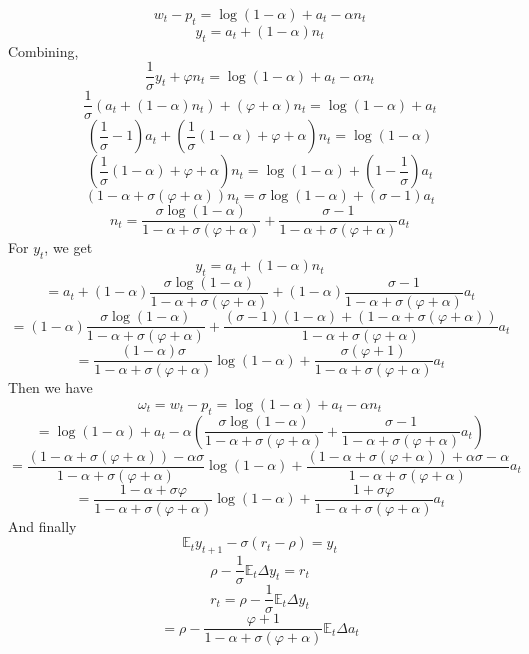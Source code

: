 \documentclass[10pt,letter]{article}
\begin{document}
\[ w_t - p_t = \log (1-\alpha) + a_t - \alpha n_t \]
\[ y_t = a_t + (1-\alpha) n_t \]
Combining,
\[ \frac{1}{\sigma}y_t + \varphi n_t = \log (1-\alpha) + a_t - \alpha n_t\]
\[ \frac{1}{\sigma}(a_t + (1-\alpha) n_t) + (\varphi + \alpha) n_t = \log (1-\alpha) + a_t \]
\[ \left(\frac{1}{\sigma} - 1\right) a_t + \left(\frac{1}{\sigma}(1-\alpha) + \varphi + \alpha \right) n_t  = \log (1-\alpha) \]
\[ \left(\frac{1}{\sigma}(1-\alpha) + \varphi + \alpha \right) n_t  = \log (1-\alpha) + \left(1 - \frac{1}{\sigma} \right) a_t  \]
\[ \left( 1-\alpha + \sigma(\varphi + \alpha) \right) n_t  = \sigma \log (1-\alpha) + \left(\sigma - 1 \right) a_t  \]
\[  n_t  = \frac{\sigma \log (1-\alpha)}{1-\alpha + \sigma(\varphi + \alpha) } + \frac{\sigma - 1}{ 1-\alpha + \sigma(\varphi + \alpha)}  a_t  \]
For $y_t$, we get
\[ y_t = a_t + (1-\alpha) n_t \]
\[ = a_t + (1-\alpha)\frac{\sigma \log (1-\alpha)}{1-\alpha + \sigma(\varphi + \alpha) } + (1-\alpha)\frac{\sigma - 1}{ 1-\alpha + \sigma(\varphi + \alpha)}  a_t \]
\[ = (1-\alpha)\frac{\sigma \log (1-\alpha)}{1-\alpha + \sigma(\varphi + \alpha) } + \frac{(\sigma - 1)(1-\alpha) + (1-\alpha + \sigma(\varphi + \alpha))}{ 1-\alpha + \sigma(\varphi + \alpha)}  a_t \]
\[ = \frac{(1-\alpha)\sigma }{1-\alpha + \sigma(\varphi + \alpha) }\log (1-\alpha) + \frac{\sigma(\varphi + 1)}{ 1-\alpha + \sigma(\varphi + \alpha)}  a_t \]
Then we have
\[ \omega_t = w_t - p_t = \log (1-\alpha) + a_t - \alpha n_t \]
\[ = \log (1-\alpha) + a_t - \alpha \left(\frac{\sigma \log (1-\alpha)}{1-\alpha + \sigma(\varphi + \alpha) } + \frac{\sigma - 1}{ 1-\alpha + \sigma(\varphi + \alpha)}  a_t  \right)\]
\[ =  \frac{(1-\alpha + \sigma(\varphi + \alpha))-\alpha \sigma }{1-\alpha + \sigma(\varphi + \alpha) }\log (1-\alpha) + \frac{(1-\alpha + \sigma(\varphi + \alpha)) + \alpha \sigma - \alpha }{ 1-\alpha + \sigma(\varphi + \alpha)}  a_t  \]
\[ =  \frac{1-\alpha + \sigma \varphi  }{1-\alpha + \sigma(\varphi + \alpha) }\log (1-\alpha) + \frac{1 + \sigma \varphi  }{ 1-\alpha + \sigma(\varphi + \alpha)}  a_t  \]
And finally
\[ \mathbb{E}_t y_{t+1} - \sigma(r_t - \rho )  = y_t \]
\[ \rho - \frac{1}{\sigma} \mathbb{E}_t \Delta y_t = r_t  \]
\[ r_t = \rho - \frac{1}{\sigma} \mathbb{E}_t \Delta y_t  \]
\[  = \rho - \frac{ \varphi + 1 }{ 1-\alpha + \sigma(\varphi + \alpha)}  \mathbb{E}_t \Delta a_t  \]
\end{document}
